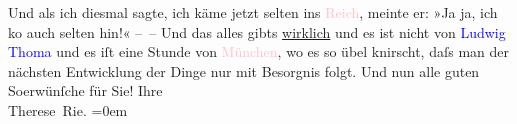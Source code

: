            \pstart
           Und als ich diesmal sagte, ich käme jetzt selten ins \textcolor{pink}{Reich}{}\ledrightnote{\textcolor{pink}{Deutschland}}, meinte er: »Ja ja, ich ko{\geminationm} auch
                    selten hin!« – – Und das alles gibts \uline{wirklich}
                    und es ist nicht von \textcolor{blue}{Ludwig Thoma}{}\ledrightnote{\textcolor{blue}{Ludwig Thoma}} und es iſt
                    eine Stunde von \textcolor{pink}{München}{}\ledrightnote{\textcolor{pink}{München}}, wo {\pb}es so übel knirscht, daſs man der nächsten Entwicklung
                    der Dinge nur mit Besorgnis folgt.\pend
           \pstart
           Und nun alle guten So{\geminationm}erwünſche für Sie!\pend
           \pstart
           Ihre{\\[\baselineskip]}\spacefill\mbox{Therese Rie.}\pend
           \leftskip=0em{}\endnumbering{}  
      